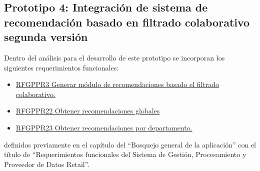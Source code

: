 \subsection{Prototipo 4: Integración de sistema de recomendación basado en filtrado colaborativo segunda versión}
Dentro del análisis para el desarrollo de este prototipo se incorporan los siguientes requerimientos funcionales: \\
\begin{itemize}
	\item \hyperlink{RFSGPyPDR}{RFGPPR3 Generar módulo de recomendaciones basado el filtrado colaborativo.}
	\item \hyperlink{RFSGPyPDR}{RFGPPR22 Obtener recomendaciones globales}
	\item \hyperlink{RFSGPyPDR}{RFGPPR23 Obtener recomendaciones por departamento.}
\end{itemize}

definidos previamente en el capítulo del ``Bosquejo general de la aplicación''  con el título de ``Requerimientos funcionales del Sistema de Gestión, Procesamiento y Proveedor de Datos Retail''. \\ \par


